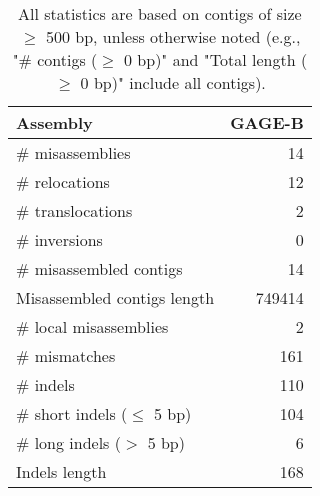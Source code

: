 \documentclass[12pt,a4paper]{article}
\begin{document}
\begin{table}[ht]
\begin{center}
\caption{All statistics are based on contigs of size $\geq$ 500 bp, unless otherwise noted (e.g., "\# contigs ($\geq$ 0 bp)" and "Total length ($\geq$ 0 bp)" include all contigs).}
\begin{tabular}{|l*{1}{|r}|}
\hline
Assembly & GAGE-B \\ \hline
\# misassemblies & 14 \\ \hline
\hspace{5mm}\# relocations & 12 \\ \hline
\hspace{5mm}\# translocations & 2 \\ \hline
\hspace{5mm}\# inversions & 0 \\ \hline
\# misassembled contigs & 14 \\ \hline
Misassembled contigs length & 749414 \\ \hline
\# local misassemblies & 2 \\ \hline
\# mismatches & 161 \\ \hline
\# indels & 110 \\ \hline
\hspace{5mm}\# short indels ($\leq$ 5 bp) & 104 \\ \hline
\hspace{5mm}\# long indels ($>$ 5 bp) & 6 \\ \hline
Indels length & 168 \\ \hline
\end{tabular}
\end{center}
\end{table}
\end{document}
